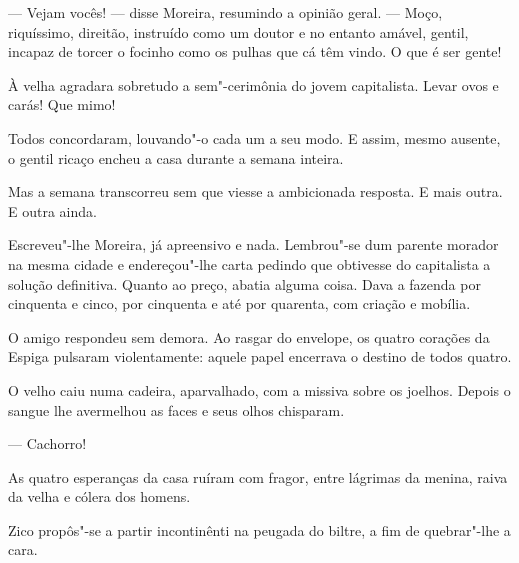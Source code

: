--- Vejam vocês! --- disse Moreira, resumindo a opinião geral. --- Moço,
riquíssimo, direitão, instruído como um doutor e no entanto amável,
gentil, incapaz de torcer o focinho como os pulhas que cá têm vindo. O
que é ser gente!

À velha agradara sobretudo a sem"-cerimônia do jovem capitalista. Levar
ovos e carás! Que mimo!

Todos concordaram, louvando"-o cada um a seu modo. E assim, mesmo
ausente, o gentil ricaço encheu a casa durante a semana inteira.

Mas a semana transcorreu sem que viesse a ambicionada resposta. E mais
outra. E outra ainda.

Escreveu"-lhe Moreira, já apreensivo e nada. Lembrou"-se dum parente
morador na mesma cidade e endereçou"-lhe carta pedindo que obtivesse do
capitalista a solução definitiva. Quanto ao preço, abatia alguma coisa.
Dava a fazenda por cinquenta e cinco, por cinquenta e até por quarenta,
com criação e mobília.

O amigo respondeu sem demora. Ao rasgar do envelope, os quatro corações
da Espiga pulsaram violentamente: aquele papel encerrava o destino de
todos quatro.


O velho caiu numa cadeira, aparvalhado, com a missiva sobre os joelhos.
Depois o sangue lhe avermelhou as faces e seus olhos chisparam.

--- Cachorro!

As quatro esperanças da casa ruíram com fragor, entre lágrimas da
menina, raiva da velha e cólera dos homens.

Zico propôs"-se a partir incontinênti na peugada do biltre, a fim de
quebrar"-lhe a cara.

